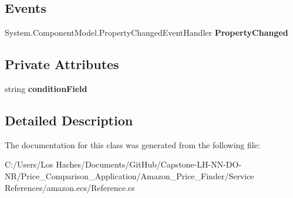 \subsection*{Events}
\begin{DoxyCompactItemize}
\item 
\hypertarget{class_price___comparison_1_1amazon_1_1ecs_1_1_offer_attributes_a07e31f211ce0e588d3f1c5c1a2ab283d}{System.\-Component\-Model.\-Property\-Changed\-Event\-Handler {\bfseries Property\-Changed}}\label{class_price___comparison_1_1amazon_1_1ecs_1_1_offer_attributes_a07e31f211ce0e588d3f1c5c1a2ab283d}

\end{DoxyCompactItemize}
\subsection*{Private Attributes}
\begin{DoxyCompactItemize}
\item 
\hypertarget{class_price___comparison_1_1amazon_1_1ecs_1_1_offer_attributes_a1fdbe7d7bea8b466d08efe2f4ca0a75e}{string {\bfseries condition\-Field}}\label{class_price___comparison_1_1amazon_1_1ecs_1_1_offer_attributes_a1fdbe7d7bea8b466d08efe2f4ca0a75e}

\end{DoxyCompactItemize}


\subsection{Detailed Description}


The documentation for this class was generated from the following file\-:\begin{DoxyCompactItemize}
\item 
C\-:/\-Users/\-Los Haches/\-Documents/\-Git\-Hub/\-Capstone-\/\-L\-H-\/\-N\-N-\/\-D\-O-\/\-N\-R/\-Price\-\_\-\-Comparison\-\_\-\-Application/\-Amazon\-\_\-\-Price\-\_\-\-Finder/\-Service References/amazon.\-ecs/Reference.\-cs\end{DoxyCompactItemize}
